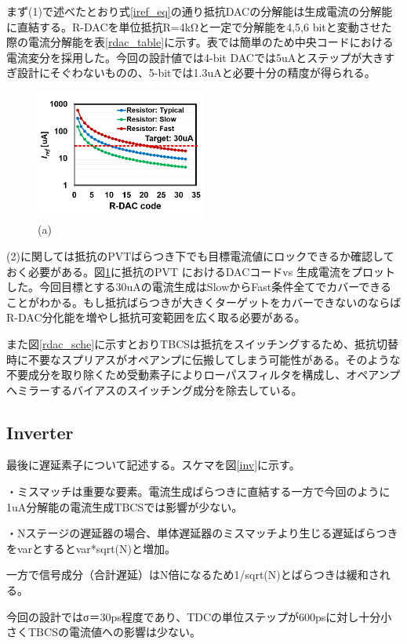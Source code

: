\documentclass[letterpaper, 10 pt, conference]{ieeeconf}  %
\begin{document}
まず(1)で述べたとおり式\ref{iref_eq}の通り抵抗DACの分解能は生成電流の分解能に直結する。R-DACを単位抵抗R=4kΩと一定で分解能を4,5,6 bitと変動させた際の電流分解能を表\ref{rdac_table}に示す。表では簡単のため中央コードにおける電流変分を採用した。今回の設計値では4-bit DACでは5uAとステップが大きすぎ設計にそぐわないものの、5-bitでは1.3uAと必要十分の精度が得られる。

\begin{figure}[!]
\centering
 \includegraphics[width=0.5\textwidth]{figs/rdaccode.png}
  \caption{(a) 
}
\label{rdac_pvt}
\end{figure}

(2)に関しては抵抗のPVTばらつき下でも目標電流値にロックできるか確認しておく必要がある。図\ref{rdac_pvt}に抵抗のPVT におけるDACコードvs 生成電流をプロットした。今回目標とする30uAの電流生成はSlowからFast条件全てでカバーできることがわかる。もし抵抗ばらつきが大きくターゲットをカバーできないのならばR-DAC分化能を増やし抵抗可変範囲を広く取る必要がある。

また図\ref{rdac_sche}に示すとおりTBCSは抵抗をスイッチングするため、抵抗切替時に不要なスプリアスがオペアンプに伝搬してしまう可能性がある。そのような不要成分を取り除くため受動素子によりローパスフィルタを構成し、オペアンプへミラーするバイアスのスイッチング成分を除去している。

\subsection{Inverter}
最後に遅延素子について記述する。スケマを図\ref{inv}に示す。

・ミスマッチは重要な要素。電流生成ばらつきに直結する一方で今回のように1uA分解能の電流生成TBCSでは影響が少ない。

・Nステージの遅延器の場合、単体遅延器のミスマッチより生じる遅延ばらつきをvarとするとvar*sqrt(N)と増加。

一方で信号成分（合計遅延）はN倍になるため1/sqrt(N)とばらつきは緩和される。

今回の設計ではσ＝30ps程度であり、TDCの単位ステップが600psに対し十分小さくTBCSの電流値への影響は少ない。
\end{document}
